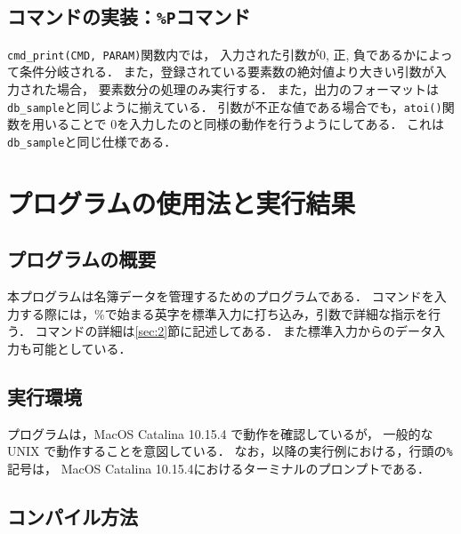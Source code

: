 \documentclass[autodetect-engine,dvi=dvipdfmx,ja=standard,
               a4j,11pt]{bxjsarticle}
\begin{document}
\subsection{コマンドの実装：\texttt{\%P}コマンド}

\verb|cmd_print(CMD, PARAM)|関数内では，
入力された引数が0, 正, 負であるかによって条件分岐される．
また，登録されている要素数の絶対値より大きい引数が入力された場合，
要素数分の処理のみ実行する．
また，出力のフォーマットは\verb|db_sample|と同じように揃えている．
引数が不正な値である場合でも，\verb|atoi()|関数を用いることで
$0$を入力したのと同様の動作を行うようにしてある．
これは\verb|db_sample|と同じ仕様である．


\section{プログラムの使用法と実行結果} \label{sec:4}

\subsection{プログラムの概要}

本プログラムは名簿データを管理するためのプログラムである．
コマンドを入力する際には，\%で始まる英字を標準入力に打ち込み，引数で詳細な指示を行う．
コマンドの詳細は\ref{sec:2}節に記述してある．
また標準入力からのデータ入力も可能としている．

\subsection{実行環境}

プログラムは，MacOS Catalina 10.15.4 で動作を確認しているが，
一般的な UNIX で動作することを意図している．
なお，以降の実行例における，行頭の\verb|%|記号は，
MacOS Catalina 10.15.4におけるターミナルのプロンプトである．

\subsection{コンパイル方法}
\end{document}
